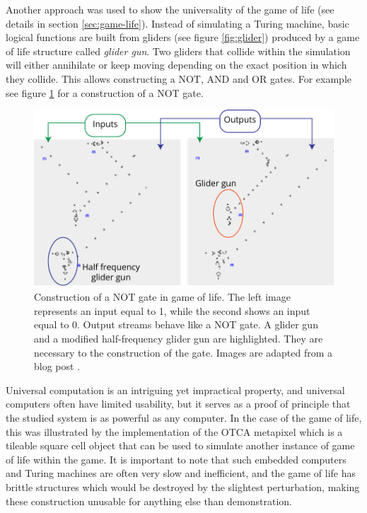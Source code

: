 Another approach was used to show the universality of the game of life (see
details in section \ref{sec:game-life}). Instead of simulating a Turing machine,
basic logical functions are built from gliders (see figure \ref{fig:glider})
produced by a game of life structure called \emph{glider gun}. Two gliders
that collide within the simulation will either annihilate or keep moving
depending on the exact position in which they collide. This allows constructing
a NOT, AND and OR gates. For example see figure \ref{fig:gol_not_gate} for a
construction of a NOT gate.

\begin{figure}[htbp]
  \centering
  \includegraphics[width=.8\linewidth]{figures/gol_not_gate}
  \caption{Construction of a NOT gate in game of life. The left image represents
    an input equal to 1, while the second shows an input equal to 0. Output
    streams behave like a NOT gate. A glider gun and a modified half-frequency
    glider gun are highlighted. They are necessary to the construction of the
    gate. Images are adapted from a blog post
    \parencite{carliniDigitalLogicGates2020}.}
  \label{fig:gol_not_gate}
\end{figure}

Universal computation is an intriguing yet impractical property, and universal
computers often have limited usability, but it serves as a proof of principle
that the studied system is as powerful as any computer. In the case of the game
of life, this was illustrated by the implementation of the OTCA metapixel which
is a tileable square cell object that can be used to simulate another instance
of game of life within the game. It is important to note that such embedded
computers and Turing machines are often very slow and inefficient, and the game
of life has brittle structures which would be destroyed by the slightest
perturbation, making these construction unusable for anything else than
demonstration.

